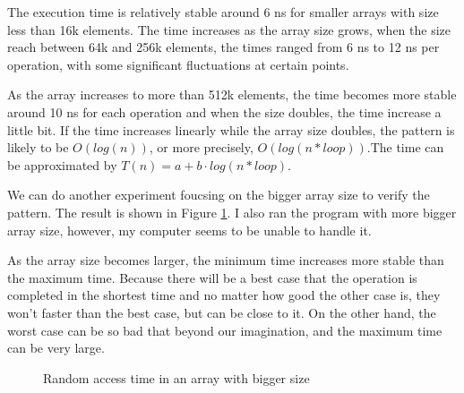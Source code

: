 \documentclass[a4paper,11pt]{article}
\begin{document}
The execution time is relatively stable around 6 ns for smaller arrays with size less 
than 16k elements. The time increases as the array size grows, when the size reach between
64k and 256k elements, the times ranged from 6 ns to 12 ns per operation, with some
significant fluctuations at certain points. 

As the array increases to more than 512k elements,
the time becomes more stable around 10 ns for each operation and when the size doubles, the time
increase a little bit. If the time increases linearly while the array size doubles, the pattern is likely
to be $O(log(n))$, or more precisely, $O(log(n * loop))$.The time can be approximated by $T(n) = a + b \cdot log(n * loop)$. 

We can do another experiment foucsing on the bigger array size to verify the pattern. 
The result is shown in Figure \ref{fig:random_access_big}.
I also ran the program with more bigger array size, however, my computer seems to be unable to handle it.

As the array size becomes larger, the minimum time increases more stable than the maximum time.
Because there will be a best case that the operation is completed in the shortest time and no 
matter how good the other case is, they won't faster than the best case, but can be close to it.
On the other hand, the worst case can be so bad that beyond our imagination, and the maximum time
can be very large.

\begin{figure}[H]
  \centering
  \caption{Random access time in an array with bigger size}
  \label{fig:random_access_big}
\end{figure}
\end{document}
